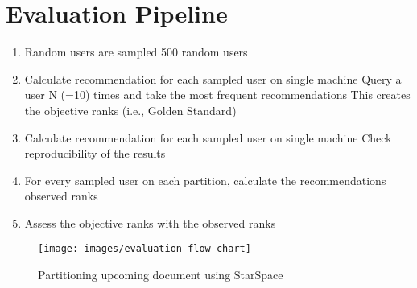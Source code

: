 \section{Evaluation Pipeline}
\label{sec:evaluation-pipeline}

\begin{enumerate}
    \item Random users are sampled
    500 random users 
    
    \item Calculate recommendation for each sampled user on single machine
    Query a user N (=10) times and  take the most frequent recommendations
    This creates the objective ranks (i.e., Golden Standard)
    
    \item Calculate recommendation for each sampled user on single machine
    Check reproducibility of the results
    
    \item For every sampled user on each partition, calculate the recommendations
    observed ranks
    
    \item Assess the objective ranks with the observed ranks
    
\end{enumerate}

\begin{figure}[!h]
	\centering
	\texttt{[image: images/evaluation-flow-chart]}
	\caption{Partitioning upcoming document using StarSpace}
	\label{fig:partitioner-uml}
\end{figure}